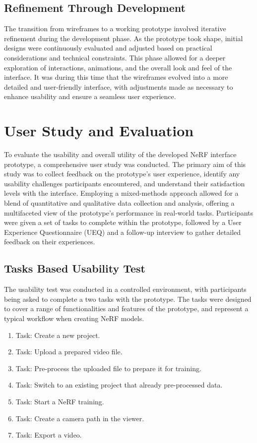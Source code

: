 \subsection*{Refinement Through Development}

The transition from wireframes to a working prototype involved iterative refinement during the development phase. 
As the prototype took shape, initial designs were continuously evaluated and adjusted based on practical considerations and technical constraints. 
This phase allowed for a deeper exploration of interactions, animations, and the overall look and feel of the interface. 
It was during this time that the wireframes evolved into a more detailed and user-friendly interface, with adjustments made as necessary to enhance usability and ensure a seamless user experience.

\section{User Study and Evaluation}
\label{sec:methodology:study}

To evaluate the usability and overall utility of the developed NeRF interface prototype, a comprehensive user study was conducted. 
The primary aim of this study was to collect feedback on the prototype's user experience, identify any usability challenges participants encountered, and understand their satisfaction levels with the interface. 
Employing a mixed-methods approach allowed for a blend of quantitative and qualitative data collection and analysis, offering a multifaceted view of the prototype's performance in real-world tasks.
Participants were given a set of tasks to complete within the prototype, followed by a User Experience Questionnaire (UEQ) and a follow-up interview to gather detailed feedback on their experiences.

\subsection*{Tasks Based Usability Test}
\label{sec:methodology:study:tasks}

The usability test was conducted in a controlled environment, with participants being asked to complete a two tasks with the prototype.
The tasks were designed to cover a range of functionalities and features of the prototype, and represent a typical workflow when creating NeRF models.

\begin{enumerate}
  \item Task: Create a new project.
  \item Task: Upload a prepared video file.
  \item Task: Pre-process the uploaded file to prepare it for training.
  \item Task: Switch to an existing project that already pre-processed data.
  \item Task: Start a NeRF training.
  \item Task: Create a camera path in the viewer.
  \item Task: Export a video.
\end{enumerate}

